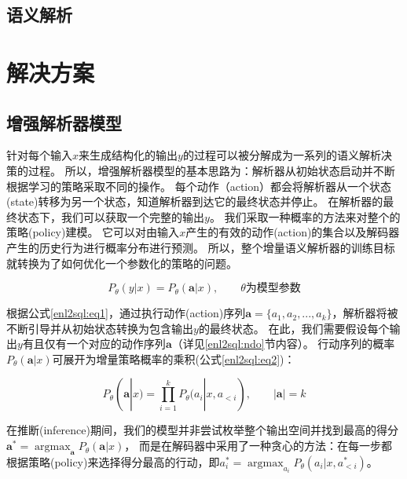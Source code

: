 \subsection{语义解析}
\section{解决方案}

\subsection{增强解析器模型}
\label{enl2sql:zqjxqmx}
针对每个输入$x$来生成结构化的输出$y$的过程可以被分解成为一系列的语义解析决策的过程。
所以，增强解析器模型的基本思路为：解析器从初始状态启动并不断根据学习的策略采取不同的操作。
每个动作（action）都会将解析器从一个状态(state)转移为另一个状态，知道解析器到达它的最终状态并停止。
在解析器的最终状态下，我们可以获取一个完整的输出$y$。
我们采取一种概率的方法来对整个的策略(policy)建模。
它可以对由输入$x$产生的有效的动作(action)的集合以及解码器产生的历史行为进行概率分布进行预测。
所以，整个增量语义解析器的训练目标就转换为了如何优化一个参数化的策略的问题。

\begin{equation}
    \label{enl2sql:eq1}
    P_{\theta}(y|x) = P_{\theta}(\boldsymbol{a}|x),  \qquad \theta\text{为模型参数}
\end{equation}

根据公式\ref{enl2sql:eq1}，通过执行动作(action)序列$\boldsymbol{a} = \{a_{1},a_{2},...,a_{k}\}$，解析器将被不断引导并从初始状态转换为包含输出$y$的最终状态。
在此，我们需要假设每个输出$y$有且仅有一个对应的动作序列$\boldsymbol{a}$（详见\ref{enl2sql:ndo}节内容）。
行动序列的概率$P_{\theta}(\boldsymbol{a}|x)$可展开为增量策略概率的乘积(公式\ref{enl2sql:eq2})：

\begin{equation}
    \label{enl2sql:eq2}
    P_{\theta}(\boldsymbol{a}|x) = \prod^k_{i=1}P_{\theta}(a_{i}|x,a_{<i}),   \qquad |\boldsymbol{a}| = k
\end{equation}

在推断(inference)期间，我们的模型并非尝试枚举整个输出空间并找到最高的得分$\boldsymbol{a}^{*} = \mathop{\arg\max}_{\boldsymbol{a}} P_{\theta}(\boldsymbol{a}|x)$，
而是在解码器中采用了一种贪心的方法：在每一步都根据策略(policy)来选择得分最高的行动，即$a^{*}_{i} = \mathop{\arg\max}_{a_{i}} P_{\theta}(a_{i}|x,a^{*}_{<i})$。


